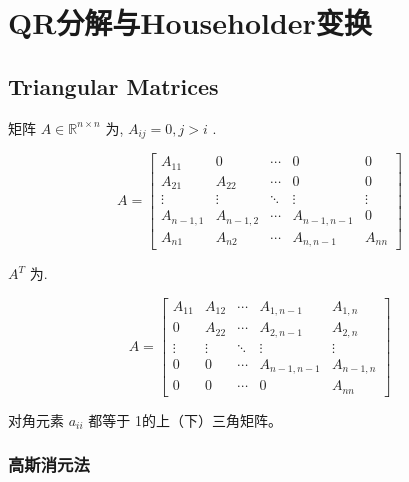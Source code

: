 \chapter{QR分解与Householder变换}

\section{Triangular Matrices}

\begin{definition}
    矩阵 $  {A} \in \mathbb{R}^{n \times n} $ 为, $ A_{i j}=0, j>i $ .

    \begin{equation} A=\left[\begin{array}{ccccc}A_{11} & 0 & \cdots & 0 & 0 \\ A_{21} & A_{22} & \cdots & 0 & 0 \\ \vdots & \vdots & \ddots & \vdots & \vdots \\ A_{n-1,1} & A_{n-1,2} & \cdots & A_{n-1, n-1} & 0 \\ A_{n 1} & A_{n 2} & \cdots & A_{n, n-1} & A_{n n}\end{array}\right] \end{equation}
\end{definition}

\begin{definition}
    $ A^{T} $ 为.

    \begin{equation} A=\left[\begin{array}{ccccc}A_{11} & A_{12} & \cdots & A_{1, n-1} & A_{1, n} \\ 0 & A_{22} & \cdots & A_{2, n-1} & A_{2, n} \\ \vdots & \vdots & \ddots & \vdots & \vdots \\ 0 & 0 & \cdots & A_{n-1, n-1} & A_{n-1, n} \\ 0 & 0 & \cdots & 0 & A_{n n}\end{array}\right] \end{equation}
\end{definition}

\begin{definition}
    对角元素 $ a_{i i} $ 都等于 1的上（下）三角矩阵。
\end{definition}

\subsection{高斯消元法}

